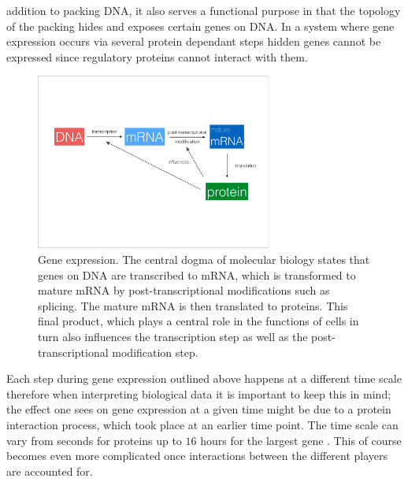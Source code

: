 addition to packing DNA, it also serves a functional purpose in that the topology of the packing hides and exposes certain genes on DNA. In a system where gene expression occurs via several protein dependant steps hidden genes cannot be expressed since regulatory proteins cannot interact with them.

\begin{figure}[!t]
  \centering
  \includegraphics[width=0.69\textwidth]{pics/dogma-bio.pdf}
  \caption{Gene expression. The central dogma of molecular biology states that genes on DNA are transcribed to mRNA, which is transformed to mature mRNA by post-transcriptional modifications such as splicing. The mature mRNA is then translated to proteins. This final product, which plays a central role in the functions of cells in turn also influences the transcription step as well as the post-transcriptional modification step.}
  \label{fig:gene-expression}
\end{figure}

Each step during gene expression outlined above happens at a different time scale therefore when interpreting biological data it is important to keep this in mind; the effect one sees on gene expression at a given time might be due to a protein interaction process, which took place at an earlier time point. The time scale can vary from seconds for proteins \citep{Herce:kq} up to $16$ hours for the largest gene \citep{Tennyson:1995dl}. This of course becomes even more complicated once interactions between the different players are accounted for.

